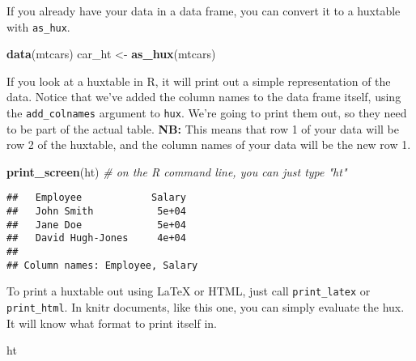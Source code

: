\documentclass[]{article}
\newenvironment{Shaded}{\begin{snugshade}}{\end{snugshade}}
\newcommand{\CommentTok}[1]{\textcolor[rgb]{0.56,0.35,0.01}{\textit{#1}}}
\newcommand{\KeywordTok}[1]{\textcolor[rgb]{0.13,0.29,0.53}{\textbf{#1}}}
\newcommand{\NormalTok}[1]{#1}
\newcommand{\StringTok}[1]{\textcolor[rgb]{0.31,0.60,0.02}{#1}}
\begin{document}
\FloatBarrier

If you already have your data in a data frame, you can convert it to a
huxtable with \texttt{as\_hux}.

\begin{Shaded}
\begin{Highlighting}[]
\KeywordTok{data}\NormalTok{(mtcars)}
\NormalTok{car_ht <-}\StringTok{ }\KeywordTok{as_hux}\NormalTok{(mtcars)}
\end{Highlighting}
\end{Shaded}

\FloatBarrier

If you look at a huxtable in R, it will print out a simple
representation of the data. Notice that we've added the column names to
the data frame itself, using the \texttt{add\_colnames} argument to
\texttt{hux}. We're going to print them out, so they need to be part of
the actual table. \textbf{NB:} This means that row 1 of your data will
be row 2 of the huxtable, and the column names of your data will be the
new row 1.

\begin{Shaded}
\begin{Highlighting}[]
\KeywordTok{print_screen}\NormalTok{(ht)     }\CommentTok{# on the R command line, you can just type "ht"}
\end{Highlighting}
\end{Shaded}

\begin{verbatim}
##   Employee            Salary  
##   John Smith           5e+04  
##   Jane Doe             5e+04  
##   David Hugh-Jones     4e+04  
## 
## Column names: Employee, Salary
\end{verbatim}

\FloatBarrier

To print a huxtable out using LaTeX or HTML, just call
\texttt{print\_latex} or \texttt{print\_html}. In knitr documents, like
this one, you can simply evaluate the hux. It will know what format to
print itself in.

\begin{Shaded}
\begin{Highlighting}[]
\NormalTok{ht}
\end{Highlighting}
\end{Shaded}
\end{document}
